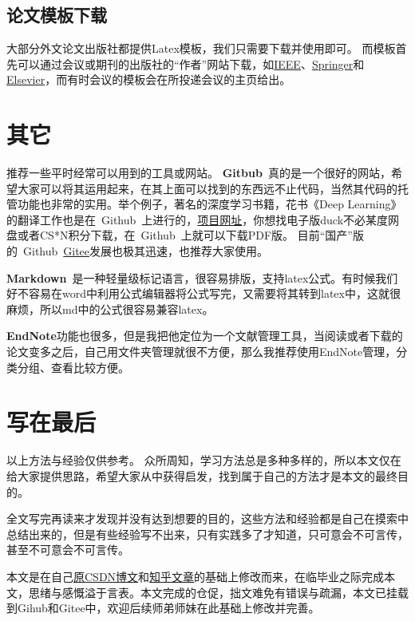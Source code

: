 \documentclass[lang=cn,11pt,a4paper]{elegantpaper}
\begin{document}
\subsection{论文模板下载}
大部分外文论文出版社都提供Latex模板，我们只需要下载并使用即可。
而模板首先可以通过会议或期刊的出版社的“作者”网站下载，如\href{https://ieeeauthorcenter.ieee.org/}{IEEE}、\href{https://www.springer.com/cn/computer-science/lncs/conference-proceedings-guidelines}{Springer}和\href{https://www.elsevier.com/authors/policies-and-guidelines/latex-instructions}{Elsevier}，而有时会议的模板会在所投递会议的主页给出。
% 

\section{其它}
推荐一些平时经常可以用到的工具或网站。
\textbf{Gitbub}~真的是一个很好的网站，希望大家可以将其运用起来，在其上面可以找到的东西远不止代码，当然其代码的托管功能也非常的实用。举个例子，著名的深度学习书籍，花书《Deep Learning》的翻译工作也是在~Github~上进行的，\href{https://github.com/exacity/deeplearningbook-chinese}{项目网址}，你想找电子版duck不必某度网盘或者CS*N积分下载，在~Github~上就可以下载PDF版。
目前“国产”版的~Github~\href{https://gitee.com/}{Gitee}发展也极其迅速，也推荐大家使用。

\textbf{Markdown}~是一种轻量级标记语言，很容易排版，支持latex公式。有时候我们好不容易在word中利用公式编辑器将公式写完，又需要将其转到latex中，这就很麻烦，所以md中的公式很容易兼容latex。

\textbf{EndNote}功能也很多，但是我把他定位为一个文献管理工具，当阅读或者下载的论文变多之后，自己用文件夹管理就很不方便，那么我推荐使用EndNote管理，分类分组、查看比较方便。

\section{写在最后}
以上方法与经验仅供参考。
众所周知，学习方法总是多种多样的，所以本文仅在给大家提供思路，希望大家从中获得启发，找到属于自己的方法才是本文的最终目的。

全文写完再读来才发现并没有达到想要的目的，这些方法和经验都是自己在摸索中总结出来的，但是有些经验写不出来，只有实践多了才知道，只可意会不可言传，甚至不可意会不可言传。

本文是在自己\href{https://blog.csdn.net/qq_40115871/article/details/115861140}{原CSDN博文}和\href{https://zhuanlan.zhihu.com/p/367339390}{知乎文章}的基础上修改而来，在临毕业之际完成本文，思绪与感慨溢于言表。本文完成的仓促，拙文难免有错误与疏漏，本文已挂载到Gihub和Gitee中，欢迎后续师弟师妹在此基础上修改并完善。
\end{document}
